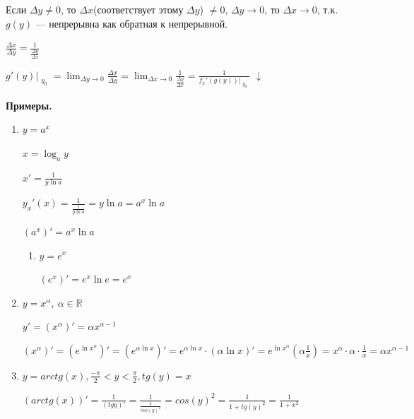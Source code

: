 \documentclass{article}
\begin{document}
    Если \( \Delta y \neq 0 \), то \(\Delta x\)(соответствует этому \(\Delta y\)) \(\neq 0\), \(\Delta y \to 0\), то \(\Delta x \to 0\), т.к. \(g(y)\) --- непрерывна как обратная к непрерывной. 

    \(\frac{\Delta x}{\Delta y} = \frac{1}{\frac{\Delta y}{\Delta x}}\)

    \( g'(y)\Bigr|_{\substack{y_0}} = \lim_{\Delta y \to 0} \frac{\Delta x}{\Delta y} = \lim_{\Delta x \to 0} \frac{1}{\frac{\Delta y}{\Delta x}} = \frac{1}{f_x'(g(y))\Bigr|_{\substack{y_0}}} \)
    \(\downarrow\)

    \textbf{Примеры.}

    \begin{enumerate}
        \item \( y = a^x \)
        
        \( x = \log_a y \)

        \( x' = \frac{1}{y\ln a} \)

        \( y_x'(x) = \frac{1}{\frac{1}{y\ln a}} = y\ln a = a^x\ln a\)

        \( (a^x)' = a^x\ln a \)

        \begin{enumerate}
            \item \( y = e^x \)
            
            \( (e^x)' = e^x\ln e = e^x \)
        \end{enumerate}

        \item \( y = x^\alpha,\ \alpha \in \mathbb{R} \)
        
        \( y' = (x^\alpha)' = \alpha x^{\alpha - 1} \)

        \( (x^\alpha)' = (e^{\ln x^\alpha})' = (e^{\alpha\ln x})' = e^{\alpha\ln x} \cdot (\alpha\ln x)' = e^{\ln x^\alpha}(\alpha\frac{1}{x}) = x^\alpha \cdot \alpha \cdot \frac{1}{x} = \alpha x^{\alpha - 1} \)

        \item \( y = arctg(x), \frac{-\pi}{2} < y < \frac{\pi}{2}, tg(y) = x \)
        
        \( (arctg(x))' = \frac{1}{(tg y)'} = \frac{1}{\frac{1}{cos(y)^2}} = cos(y)^2 = \frac{1}{1 + tg(y)^2} = \frac{1}{1 + x^2} \)
        
    \end{enumerate}
\end{document}
